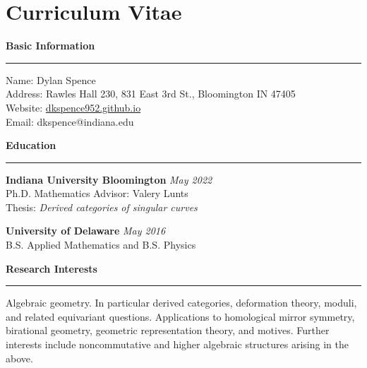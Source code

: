\documentclass[showabstract,showacknowledgments,showpreface,showdedication,12pt]{iuphd}
\begin{document}






\chapter*{Curriculum Vitae}
\thispagestyle{empty}
\textbf{Basic Information}
\vspace{1pt}
\hrule 
\vspace{\baselineskip}
\noindent Name: Dylan Spence \\
Address: Rawles Hall 230, 831 East 3rd St., Bloomington IN 47405 \\
Website: \url{dkspence952.github.io}\\
Email: dkspence@indiana.edu

\noindent \textbf{Education}
\vspace{1pt}
\hrule 
\vspace{\baselineskip}

\noindent \textbf{Indiana University Bloomington} \hfill \emph{May 2022} \\
Ph.D. Mathematics \hfill Advisor: Valery Lunts \\
Thesis: \emph{Derived categories of singular curves}

\noindent \textbf{University of Delaware} \hfill \emph{May 2016} \\
B.S. Applied Mathematics and B.S. Physics 

\noindent \textbf{Research Interests}
\vspace{1pt}
\hrule 
\vspace{\baselineskip}

\noindent Algebraic geometry. In particular derived categories, deformation theory, moduli, and related equivariant questions. Applications to homological mirror symmetry, birational geometry, geometric representation theory, and motives. Further interests include noncommutative and higher algebraic structures arising in the above.
\end{document}
